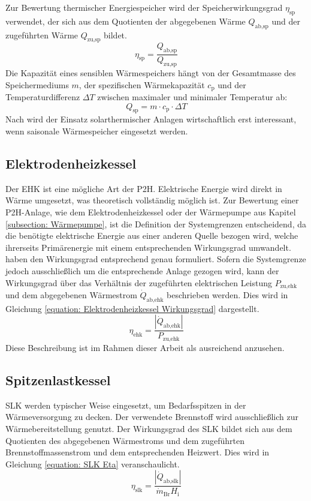 Zur Bewertung thermischer Energiespeicher wird der Speicherwirkungsgrad $\eta_\text{sp}$ verwendet, der sich aus dem Quotienten der abgegebenen Wärme $Q_\text{ab,sp}$ und der zugeführten Wärme $Q_\text{zu,sp}$ bildet.
	\begin{equation}\label{equation: Speicherwirkungsgrad}
		\eta_\text{sp} = \dfrac{Q_\text{ab,sp}}{Q_\text{zu,sp}}
	\end{equation} 
Die Kapazität eines sensiblen Wärmespeichers hängt von der Gesamtmasse des Speichermediums $m$, der spezifischen Wärmekapazität $c_\text{p}$ und der Temperaturdifferenz $\Delta T$ zwischen maximaler und minimaler Temperatur ab:
	\begin{equation}\label{equation: Speicherkapazität}
		Q_\text{sp} = m \cdot c_\text{p} \cdot \Delta T
	\end{equation} 
Nach \citet{CARPANETO2015714} wird der Einsatz solarthermischer Anlagen wirtschaftlich erst interessant, wenn saisonale Wärmespeicher eingesetzt werden.

\subsection{Elektrodenheizkessel}
Der \acf{EHK} ist eine mögliche Art der \ac{P2H}. Elektrische Energie wird direkt in Wärme umgesetzt, was theoretisch vollständig möglich ist. Zur Bewertung einer \ac{P2H}-Anlage, wie dem Elektrodenheizkessel oder der Wärmepumpe aus Kapitel \ref{subsection: Wärmepumpe}, ist die Definition der Systemgrenzen entscheidend, da die benötigte elektrische Energie aus einer anderen Quelle bezogen wird, welche ihrerseits Primärenergie mit einem entsprechenden Wirkungsgrad umwandelt. \citet{Baehr2012} haben den Wirkungsgrad entsprechend genau formuliert. Sofern die Systemgrenze jedoch ausschließlich um die entsprechende Anlage gezogen wird, kann der Wirkungsgrad über das Verhältnis der zugeführten elektrischen Leistung $P_\text{zu,ehk}$ und dem abgegebenen Wärmestrom $\dot{Q}_\text{ab,ehk}$ beschrieben werden. Dies wird in Gleichung \ref{equation: Elektrodenheizkessel Wirkungsgrad} dargestellt.
	\begin{equation}\label{equation: Elektrodenheizkessel Wirkungsgrad}
		\eta_\text{ehk} = \frac{|\dot{Q}_\text{ab,ehk}|}{P_\text{zu,ehk}}
	\end{equation}
Diese Beschreibung ist im Rahmen dieser Arbeit als ausreichend anzusehen.

\subsection{Spitzenlastkessel}
\acf{SLK} werden typischer Weise eingesetzt, um Bedarfsspitzen in der Wärmeversorgung zu decken. Der verwendete Brennstoff wird ausschließlich zur Wärmebereitstellung genutzt. Der Wirkungsgrad des \ac{SLK} bildet sich aus dem Quotienten des abgegebenen Wärmestroms und dem zugeführten Brennstoffmassenstrom und dem entsprechenden Heizwert. Dies wird in Gleichung \ref{equation: SLK Eta} veranschaulicht.
	\begin{equation}
		\label{equation: SLK Eta}
		\eta_\text{slk} = 	\frac{|\dot{Q}_\text{ab,slk}|}{\dot{m}_\text{Br} H_\text{i}}	
	\end{equation}

